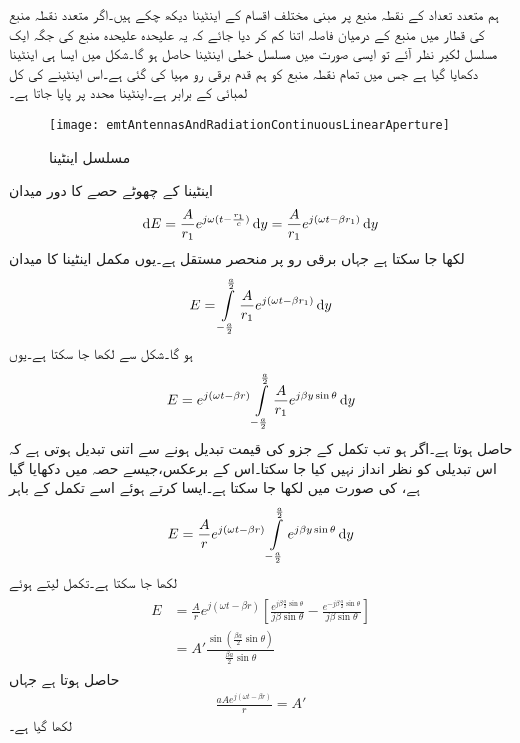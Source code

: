 ہم متعدد تعداد کے نقطہ منبع پر مبنی مختلف اقسام کے اینٹینا دیکھ چکے ہیں۔اگر متعدد نقطہ منبع کی قطار میں منبع کے درمیان فاصلہ اتنا کم کر دیا جائے کہ یہ علیحدہ علیحدہ منبع کی جگہ ایک مسلسل لکیر نظر آئے تو ایسی صورت میں مسلسل خطی اینٹینا حاصل ہو گا۔شکل  میں ایسا ہی اینٹینا دکھایا گیا ہے جس میں تمام نقطہ منبع کو ہم قدم برقی رو مہیا کی گئی ہے۔اس اینٹینے کی کل لمبائی  کے برابر ہے۔اینٹینا  محدد پر پایا جاتا ہے۔  

\begin{figure}
\centering
\texttt{[image: emtAntennasAndRadiationContinuousLinearAperture]}
\caption{مسلسل اینٹینا}
\label{شکل_اینٹینا_مسلسل_اینٹینا}
\end{figure}

اینٹینا کے چھوٹے حصے  کا دور میدان 
\begin{align}
\dif E=\frac{A}{r_1} e^{j\omega (t -\frac{r_1}{c})} \dif y=\frac{A}{r_1} e^{j(\omega t -\beta r_1)} \dif y
\end{align}
لکھا جا سکتا ہے جہاں  برقی رو پر منحصر مستقل ہے۔یوں مکمل اینٹینا کا میدان
\begin{align}
E=\int \limits_{-\frac{a}{2}}^{\frac{a}{2}} \frac{A}{r_1} e^{j(\omega t -\beta r_1)} \dif y
\end{align}
ہو گا۔شکل سے  لکھا جا سکتا ہے۔یوں
\begin{align}
E=e^{j(\omega t -\beta r)}\int \limits_{-\frac{a}{2}}^{\frac{a}{2}} \frac{A}{r_1} e^{j \beta y\sin \theta} \dif y
\end{align}
حاصل ہوتا ہے۔اگر  ہو تب تکمل کے  جزو کی قیمت  تبدیل ہونے سے  اتنی تبدیل ہوتی ہے کہ اس تبدیلی کو نظر انداز نہیں کیا جا سکتا۔اس کے برعکس،جیسے حصہ  میں دکھایا گیا ہے،   کی صورت میں   لکھا جا سکتا ہے۔ایسا کرتے ہوئے اسے  تکمل کے باہر
\begin{align}
E=\frac{A}{r}e^{j(\omega t -\beta r)}\int \limits_{-\frac{a}{2}}^{\frac{a}{2}} e^{j \beta y\sin \theta} \dif y
\end{align}
لکھا جا سکتا ہے۔تکمل لیتے ہوئے
\begin{gather}
\begin{aligned}\label{مساوات_اینٹینا_مسلسل}
E&=\frac{A}{r}e^{j(\omega t -\beta r)} \left[\frac{e^{j \beta\frac{a}{2} \sin \theta}}{j \beta\sin \theta} -\frac{e^{-j \beta\frac{a}{2} \sin \theta}}{j \beta\sin \theta} \right]\\
&=A' \frac{\sin \left(\frac{\beta a }{2} \sin \theta \right)}{\frac{\beta a }{2}\sin \theta}
\end{aligned}
\end{gather}
حاصل ہوتا ہے جہاں
\begin{align*}
\frac{a Ae^{j(\omega t -\beta r)}}{r}=A'
\end{align*}
لکھا گیا ہے۔

